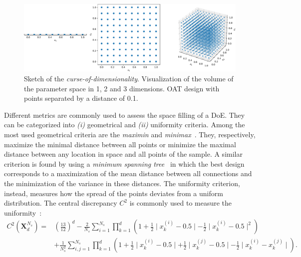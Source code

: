 \begin{figure}[!ht]
\centering
\includegraphics[width=\linewidth,keepaspectratio]{fig/literature/curse_dim.pdf}
\caption{Sketch of the \emph{curse-of-dimensionality}. Visualization of the volume of the parameter space in 1, 2 and 3 dimensions. OAT design with points separated by a distance of 0.1.}
\label{fig:curse_dim}
\end{figure}

Different metrics are commonly used to assess the space filling of a DoE. They can be categorized into \emph{(i)} geometrical and \emph{(ii)} uniformity criteria. Among the most used geometrical criteria are the \emph{maximin} and \emph{minimax}~\citep{Pronzato2017}. They, respectively, maximize the minimal distance between all points or minimize the maximal distance between any location in space and all points of the sample. A similar criterion is found by using a \emph{minimum spanning tree}~\citep{Franco2009} in which the best design corresponds to a maximization of the mean distance between all connections and the minimization of the variance in these distances. The uniformity criterion, instead, measures how the spread of the points deviates from a uniform distribution. The central discrepancy $C^2$ is commonly used to measure the uniformity~\citep{Fang2006,Damblin2013}:
\begin{align}
C^2(\mathbf{X}^{N_s}_d) =& \left( \frac{13}{12} \right)^d - \frac{2}{N_s}\displaystyle\sum_{i=1}^{N_s}\prod_{k=1}^{d} \left( 1 + \frac{1}{2} \mid  x_k^{(i)} - 0.5\mid - \frac{1}{2} \mid  x_k^{(i)} - 0.5\mid^2\right)\\ \nonumber
& + \frac{1}{N_s^2}\sum_{i,j=1}^{N_s}\prod_{k=1}^d \left( 1 + \frac{1}{2} \mid  x_k^{(i)} - 0.5\mid + \frac{1}{2} \mid  x_k^{(j)} - 0.5\mid - \frac{1}{2} \mid  x_k^{(i)} - x_k^{(j)}\mid \right). \label{eq:c2}
\end{align}

